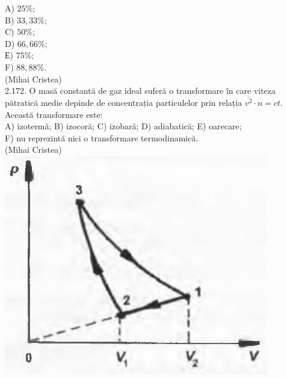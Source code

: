 \documentclass[10pt]{article}
\begin{document}
A) $25 \%$;\\
B) $33,33 \%$;\\
C) $50 \%$;\\
D) $66,66 \%$;\\
Е) $75 \%$;\\
F) $88,88 \%$.\\
(Mihai Cristea)\\
2.172. O masă constantă de gaz ideal suferă o transformare în care viteza pătratică medie depinde de concentrația particulelor prin relația $\overline{v^{2}} \cdot n=c t$. Această transformare este:\\
A) izotermă; B) izocoră; C) izobară; D) adiabatică; E) oarecare;\\
F) nu reprezintă nici o transformare termodinamică.\\
(Mihai Cristea)\\
\includegraphics[max width=\textwidth, center]{2025_07_01_5b3ff9fa0d508c8e9f17g-112}
\end{document}
